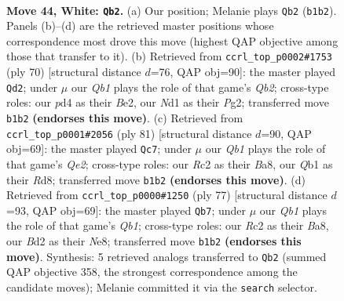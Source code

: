 \documentclass[11pt]{article}
\begin{document}
\clearpage

\begin{figure}[p]\centering
\begin{subfigure}{0.46\textwidth}\centering
\resizebox{\linewidth}{!}{%
\newchessgame
\chessboard[
  setfen={n1r1n1k1/1q2b3/p4r2/P1p2p1p/3p1Pp1/1P4P1/2RBP2P/RQ1NN1K1 w - - 4 44},
  showmover=false,
  pgfstyle=straightmove, color=movearrow, markmove={b1-b2}
]}
\caption{}
\end{subfigure}\hfill
\begin{subfigure}{0.46\textwidth}\centering
\resizebox{\linewidth}{!}{%
\newchessgame
\chessboard[
  setfen={3r1k2/1pr2bp1/pqnppp1p/8/P1P1PP2/1PNR3P/1Q2B1PK/5R2 w - - 1 36},
  showmover=false,
  pgfstyle=straightmove, color=movearrow, markmove={b2-d2}
]}
\caption{}
\end{subfigure}
\\[4pt]
\begin{subfigure}{0.46\textwidth}\centering
\resizebox{\linewidth}{!}{%
\newchessgame
\chessboard[
  setfen={b2r2k1/4q1p1/1p1pprn1/6b1/PpP4p/1P3P1P/2Q1N1PB/R2R1B1K b - - 3 41},
  showmover=false,
  pgfstyle=straightmove, color=movearrow, markmove={e7-c7}
]}
\caption{}
\end{subfigure}\hfill
\begin{subfigure}{0.46\textwidth}\centering
\resizebox{\linewidth}{!}{%
\newchessgame
\chessboard[
  setfen={bqr1n1k1/5pp1/rp1pp2p/1N6/1PP1PP2/5B1P/1Q4P1/2R2R1K b - - 24 39},
  showmover=false,
  pgfstyle=straightmove, color=movearrow, markmove={b8-b7}
]}
\caption{}
\end{subfigure}
\caption{\textbf{Move 44, White: \texttt{Qb2}.} (a) Our position; Melanie plays \texttt{Qb2} (\texttt{b1b2}). Panels (b)--(d) are the retrieved master positions whose correspondence most drove this move (highest QAP objective among those that transfer to it). (b) Retrieved from \texttt{ccrl\_top\_p0002\#1753} (ply 70) [structural distance $d$=76, QAP obj=90]: the master played \texttt{Qd2}; under $\mu$ our \emph{Qb1} plays the role of that game's \emph{Qb2}; cross-type roles: our \emph{p}d4 as their \emph{B}e2, our \emph{N}d1 as their \emph{P}g2; transferred move \texttt{b1b2} \textbf{(endorses this move)}. (c) Retrieved from \texttt{ccrl\_top\_p0001\#2056} (ply 81) [structural distance $d$=90, QAP obj=69]: the master played \texttt{Qc7}; under $\mu$ our \emph{Qb1} plays the role of that game's \emph{Qe2}; cross-type roles: our \emph{R}c2 as their \emph{B}a8, our \emph{Q}b1 as their \emph{R}d8; transferred move \texttt{b1b2} \textbf{(endorses this move)}. (d) Retrieved from \texttt{ccrl\_top\_p0000\#1250} (ply 77) [structural distance $d$=93, QAP obj=69]: the master played \texttt{Qb7}; under $\mu$ our \emph{Qb1} plays the role of that game's \emph{Qb1}; cross-type roles: our \emph{R}c2 as their \emph{B}a8, our \emph{B}d2 as their \emph{N}e8; transferred move \texttt{b1b2} \textbf{(endorses this move)}. Synthesis: 5 retrieved analogs transferred to \texttt{Qb2} (summed QAP objective 358, the strongest correspondence among the candidate moves); Melanie committed it via the \texttt{search} selector.}
\label{fig:thought-m86}
\end{figure}
\end{document}

